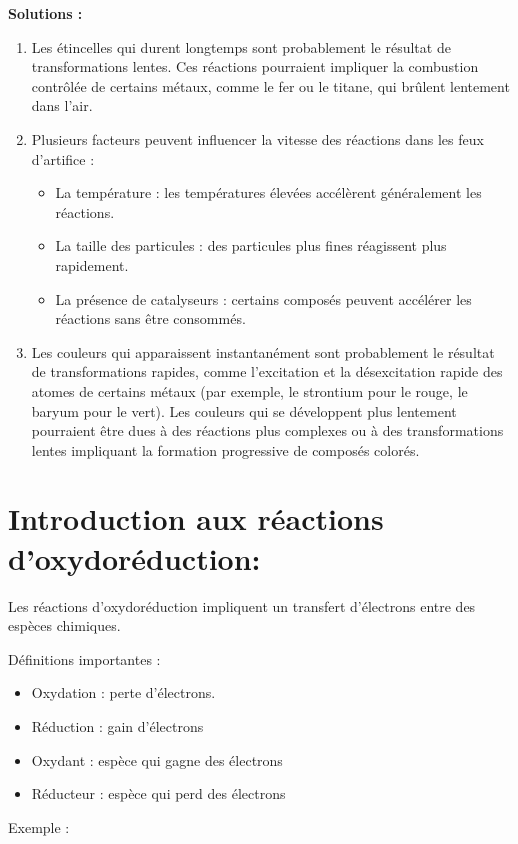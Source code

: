 \documentclass[12pt]{article}
\begin{document}
\textbf{Solutions :}

\begin{enumerate}
  \item  Les étincelles qui durent longtemps sont probablement le résultat de transformations lentes. Ces réactions pourraient impliquer la combustion contrôlée de certains métaux, comme le fer ou le titane, qui brûlent lentement dans l'air.
  \item Plusieurs facteurs peuvent influencer la vitesse des réactions dans les feux d'artifice :
  \begin{itemize}
    \item La température : les températures élevées accélèrent généralement les réactions.
    \item La taille des particules : des particules plus fines réagissent plus rapidement.
    \item La présence de catalyseurs : certains composés peuvent accélérer les réactions sans être consommés.
  \end{itemize}
\item Les couleurs qui apparaissent instantanément sont probablement le résultat de transformations rapides, comme l'excitation et la désexcitation rapide des atomes de certains métaux (par exemple, le strontium pour le rouge, le baryum pour le vert). Les couleurs qui se développent plus lentement pourraient être dues à des réactions plus complexes ou à des transformations lentes impliquant la formation progressive de composés colorés.
\end{enumerate}



\section{Introduction aux réactions d'oxydoréduction: }
Les réactions d'oxydoréduction impliquent un transfert d'électrons entre des espèces chimiques.

{Définitions importantes :} 

\begin{itemize}
  \item Oxydation : perte d'électrons.
  \item Réduction : gain d'électrons
  \item Oxydant : espèce qui gagne des électrons
  \item Réducteur : espèce qui perd des électrons
\end{itemize}

Exemple :
\end{document}
